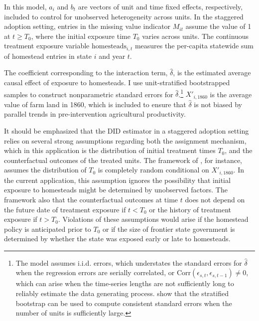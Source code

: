 \documentclass[12pt]{article}
\begin{document}
{In this model, $a_i$ and $b_t$ are vectors of unit and time fixed effects, respectively, included to control for unobserved heterogeneity across units. In the staggered adoption setting, entries in the missing value indicator $M_{it}$ assume the value of 1 at $t \geq T_0$, where the initial exposure time $T_0$ varies across units. The continuous treatment exposure variable $\text{homesteads}_{i, t}$ measures the per-capita statewide sum of homestead entries in state $i$ and year $t$.

The coefficient corresponding to the interaction term, $\hat{\delta}$, is the estimated average causal effect of exposure to homesteads. I use unit-stratified bootstrapped samples to construct nonparametric standard errors for $\hat{\delta}$.\footnote{The model assumes i.i.d. errors, which understates the standard errors for $\hat{\delta}$ when the regression errors are serially correlated, or $\mathrm{Corr} (\epsilon_{s, t}, \epsilon_{s, t-1}) \neq 0$, which can arise when the time-series lengths are not sufficiently long to reliably estimate the data generating process. \citet{bertrand2004much} show that the stratified bootstrap can be used to compute consistent standard errors when the number of units is sufficiently large.} $X'_{i,1860}$ is the average value of farm land in 1860, which is included to ensure that $\hat{\delta}$ is not biased by parallel trends in pre-intervention agricultural productivity. 

It should be emphasized that the DID estimator in a staggered adoption setting relies on several strong assumptions regarding both the assignment mechanism, which in this application is the distribution of initial treatment times $T_0$, and the counterfactual outcomes of the treated units. The framework of \citet{athey2018design}, for instance, assumes the distribution of $T_0$ is completely random conditional on $X'_{i,1860}$. In the current application, this assumption ignores the possibility that initial exposure to homesteads might be determined by unobserved factors. The framework also that the counterfactual outcomes at time $t$ does not depend on the future date of treatment exposure if $t < T_0$ or the history of treatment exposure if $t > T_0$. Violations of these assumptions would arise if the homestead policy is anticipated prior to $T_0$ or if the size of frontier state government is determined by whether the state was exposed early or late to homesteads. 

}
\end{document}

